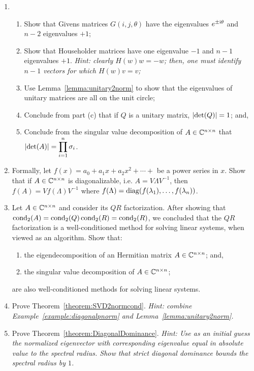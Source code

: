 \begin{enumerate}
\item \begin{enumerate}

\item Show that Givens matrices $G(i,j,\theta)$ have the eigenvalues $e^{\pm{\rm i}\theta}$ and $n-2$ eigenvalues $+1$;

\item Show that Householder matrices have one eigenvalue $-1$ and $n-1$ eigenvalues $+1$. {\em Hint: clearly $H(w)w=-w$; then, one must identify $n-1$ vectors for which $H(w)v = v$;}

\item Use Lemma~\ref{lemma:unitary2norm} to show that the eigenvalues of unitary matrices are all on the unit circle;

\item Conclude from part (c) that if $Q$ is a unitary matrix, $\left|{\det(Q)}\right| = 1$; and,

\item Conclude from the singular value decomposition of $A\in\mathbb{C}^{n\times n}$ that $\displaystyle \left|{\det(A)}\right| = \prod_{i=1}^n\sigma_i$.

\end{enumerate}

\item Formally, let $f(x) = a_0 + a_1x + a_2x^2 + \cdots +$ be a power series in $x$. Show that if $A\in\mathbb{C}^{n\times n}$ is diagonalizable, i.e. $A=V\Lambda V^{-1}$, then $f(A) = Vf(\Lambda)V^{-1}$ where $f(\Lambda) = \operatorname{diag}(f(\lambda_1),\ldots,f(\lambda_n))$.

\item Let $A\in\mathbb{C}^{n\times n}$ and consider its $QR$ factorization. After showing that $\operatorname{cond}_2(A) = \operatorname{cond}_2(Q)\operatorname{cond}_2(R) = \operatorname{cond}_2(R)$, we concluded that the $QR$ factorization is a well-conditioned method for solving linear systems, when viewed as an algorithm. Show that:
\begin{enumerate}
\item the eigendecomposition of an Hermitian matrix $A\in\mathbb{C}^{n\times n}$; and,
\item the singular value decomposition of $A\in\mathbb{C}^{n\times n}$;
\end{enumerate}
are also well-conditioned methods for solving linear systems.

\item Prove Theorem~\ref{theorem:SVD2normcond}. {\em Hint: combine Example~\ref{example:diagonalpnorm} and Lemma~\ref{lemma:unitary2norm}.}

\item Prove Theorem~\ref{theorem:DiagonalDominance}. {\em Hint: Use as an initial guess the normalized eigenvector with corresponding eigenvalue equal in absolute value to the spectral radius. Show that strict diagonal dominance bounds the spectral radius by $1$.}

\end{enumerate}